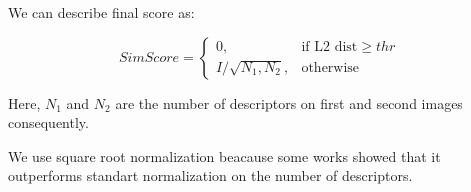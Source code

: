 \documentclass[11pt]{article} %
\begin{document}
We can describe final score as:

$$
    SimScore = 
\begin{cases}
    0,& \text{if L2 dist} \geq thr\\
    I / \sqrt{N_1, N_2},              & \text{otherwise}
\end{cases}
$$

Here, $N_1$ and $N_2$ are the number of descriptors on first and second images consequently.

We use square root normalization beacause some works\cite{jegou:inria-00602325} showed that it
outperforms standart normalization on the number of descriptors.




\end{document}
